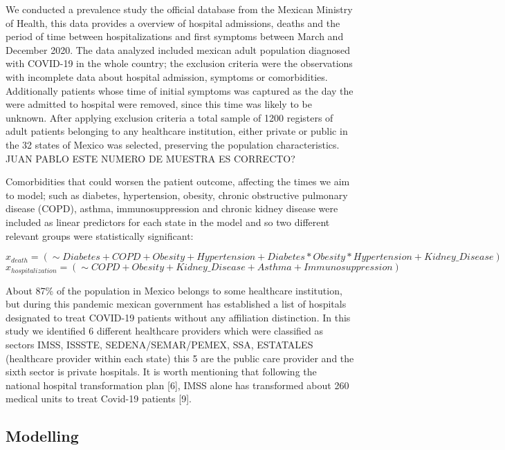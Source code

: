 \documentclass[10pt,letterpaper]{article}
\begin{document}
We conducted a prevalence study the official database from the Mexican
Ministry of Health, this data provides a overview of hospital
admissions, deaths and the period of time between hospitalizations and
first symptoms between March and December 2020. The data analyzed
included mexican adult population diagnosed with COVID-19 in the whole
country; the exclusion criteria were the observations with incomplete
data about hospital admission, symptoms or comorbidities. Additionally
patients whose time of initial symptoms was captured as the day the were
admitted to hospital were removed, since this time was likely to be
unknown. After applying exclusion criteria a total sample of 1200
registers of adult patients belonging to any healthcare institution,
either private or public in the 32 states of Mexico was selected,
preserving the population characteristics. JUAN PABLO ESTE NUMERO DE
MUESTRA ES CORRECTO?

Comorbidities that could worsen the patient outcome, affecting the times
we aim to model; such as diabetes, hypertension, obesity, chronic
obstructive pulmonary disease (COPD), asthma, immunosuppression and
chronic kidney disease were included as linear predictors for each state
in the model and so two different relevant groups were statistically
significant:

\[x_{death} = (\sim Diabetes+COPD+Obesity+Hypertension+Diabetes*Obesity*Hypertension+Kidney\_Disease)\]
\[x_{hospitalization} = (\sim COPD+Obesity+Kidney\_Disease+Asthma+Immunosuppression)\]

About 87\% of the population in Mexico belongs to some healthcare
institution, but during this pandemic mexican government has established
a list of hospitals designated to treat COVID-19 patients without any
affiliation distinction. In this study we identified 6 different
healthcare providers which were classified as sectors IMSS, ISSSTE,
SEDENA/SEMAR/PEMEX, SSA, ESTATALES (healthcare provider within each
state) this 5 are the public care provider and the sixth sector is
private hospitals. It is worth mentioning that following the national
hospital transformation plan {[}6{]}, IMSS alone has transformed about
260 medical units to treat Covid-19 patients {[}9{]}.

\hypertarget{modelling}{%
\subsection{Modelling}\label{modelling}}
\end{document}
